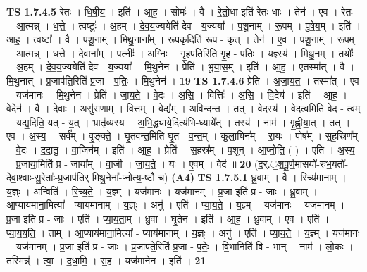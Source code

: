 \documentclass[17pt]{extarticle}
\begin{document}
                  \newline
                                \textbf{ TS 1.7.4.5} \newline
                  रेतः॑ । धि॒षी॒य॒ । इति॑ । आ॒ह॒ । सोमः॑ । वै । रे॒तो॒धा इति॑ रेतः-धाः । तेन॑ । ए॒व । रेतः॑ । आ॒त्मन्न् । ध॒त्ते॒ । त्वष्टुः॑ । अ॒हम् । दे॒व॒य॒ज्ययेति॑ देव - य॒ज्यया᳚ । प॒शू॒नाम् । रू॒पम् । पु॒षे॒य॒म् । इति॑ । आ॒ह॒ । त्वष्टा᳚ । वै । प॒शू॒नाम् । मि॒थु॒नाना᳚म् । रू॒प॒कृदिति॑ रूप - कृत् । तेन॑ । ए॒व । प॒शू॒नाम् । रू॒पम् । आ॒त्मन्न् । ध॒त्ते॒ । दे॒वाना᳚म् । पत्नीः᳚ । अ॒ग्निः । गृ॒हप॑ति॒रिति॑ गृ॒ह - प॒तिः॒ । य॒ज्ञ्स्य॑ । मि॒थु॒नम् । तयोः᳚ । अ॒हम् । दे॒व॒य॒ज्ययेति॑ देव - य॒ज्यया᳚ । मि॒थु॒नेन॑ । प्रेति॑ । भू॒या॒स॒म् । इति॑ । आ॒ह॒ । ए॒तस्मा᳚त् । वै । मि॒थु॒नात् । प्र॒जाप॑ति॒रिति॑ प्र॒जा - प॒तिः॒ । मि॒थु॒नेन॑ । \textbf{  19} \newline
                  \newline
                                \textbf{ TS 1.7.4.6} \newline
                  प्रेति॑ । अ॒जा॒य॒त॒ । तस्मा᳚त् । ए॒व । यज॑मानः । मि॒थु॒नेन॑ । प्रेति॑ । जा॒य॒ते॒ । वे॒दः । अ॒सि॒ । वित्तिः॑ । अ॒सि॒ । वि॒देय॑ । इति॑ । आ॒ह॒ । वे॒देन॑ । वै । दे॒वाः । असु॑राणाम् । वि॒त्तम् । वेद्य᳚म् । अ॒वि॒न्द॒न्त॒ । तत् । वे॒दस्य॑ । वे॒द॒त्वमिति॑ वेद - त्वम् । यद्य॒दिति॒ यत् - य॒त् । भ्रातृ॑व्यस्य । अ॒भि॒द्ध्याये॒दित्य॑भि-ध्याये᳚त् । तस्य॑ । नाम॑ । गृ॒ह्णी॒या॒त् । तत् । ए॒व । अ॒स्य॒ । सर्व᳚म् । वृ॒ङ्क्ते॒ । घृ॒तव॑न्त॒मिति॑ घृ॒त - व॒न्त॒म् । कु॒ला॒यिन᳚म् । रा॒यः । पोष᳚म् । स॒ह॒स्रिण᳚म् । वे॒दः । द॒दा॒तु॒ । वा॒जिन᳚म् । इति॑ । आ॒ह॒ । प्रेति॑ । स॒हस्र᳚म् । प॒शून् । आ॒प्नो॒ति॒ ( ) । एति॑ । अ॒स्य॒ । प्र॒जाया॒मिति॑ प्र - जाया᳚म् । वा॒जी । जा॒य॒ते॒ । यः । ए॒वम् । वेद॑ ॥ \textbf{  20} \newline
                  \newline
                       (द॒र्.॒श॒पू॒र्ण॒मासयो॑-रुभ॒यतो॑-देवा॒श्वाः-सु॒रेताः᳚-प्र॒जाप॑तिर् मिथु॒नेना᳚-प्नोत्य॒-ष्टौ च॑)  \textbf{(A4)} \newline \newline
                                \textbf{ TS 1.7.5.1} \newline
                  ध्रु॒वाम् । वै । रिच्य॑मानाम् । य॒ज्ञ्ः । अन्विति॑ । रि॒च्य॒ते॒ । य॒ज्ञ्म् । यज॑मानः । यज॑मानम् । प्र॒जा इति॑ प्र - जाः । ध्रु॒वाम् । आ॒प्याय॑माना॒मित्या᳚ - प्याय॑मानाम् । य॒ज्ञ्ः । अनु॑ । एति॑ । प्या॒य॒ते॒ । य॒ज्ञ्म् । यज॑मानः । यज॑मानम् । प्र॒जा इति॑ प्र - जाः । एति॑ । प्या॒य॒ता॒म् । ध्रु॒वा । घृ॒तेन॑ । इति॑ । आ॒ह॒ । ध्रु॒वाम् । ए॒व । एति॑ । प्या॒य॒य॒ति॒ । ताम् । आ॒प्याय॑माना॒मित्या᳚ - प्याय॑मानाम् । य॒ज्ञ्ः । अनु॑ । एति॑ । प्या॒य॒ते॒ । य॒ज्ञ्म् । यज॑मानः । यज॑मानम् । प्र॒जा इति॑ प्र - जाः । प्र॒जाप॑ते॒रिति॑ प्र॒जा - प॒तेः॒ । वि॒भानिति॑ वि - भान् । नाम॑ । लो॒कः । तस्मिन्न्॑ । त्वा॒ । द॒धा॒मि॒ । स॒ह । यज॑मानेन । इति॑ । \textbf{  21} \newline
\end{document}
